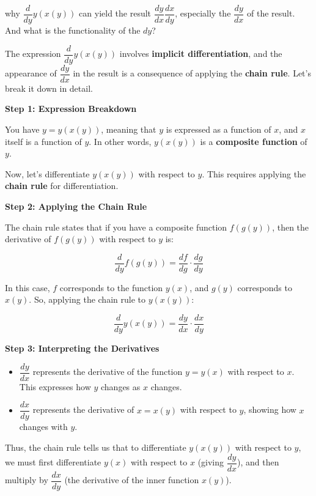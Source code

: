 \documentclass[a4paper,12pt]{book}
\begin{document}
\begin{bluebox}
why \(\dfrac{d}{dy} y(x(y))\) can yield the result \(\dfrac{dy}{dx} \dfrac{dx}{dy}\), especially the \(\dfrac{dy}{dx}\) of the result. And what is the functionality of the \(dy\)?
\end{bluebox}

The expression \( \dfrac{d}{dy} y(x(y)) \) involves \textbf{implicit differentiation}, and the appearance of \( \dfrac{dy}{dx} \) in the result is a consequence of applying the \textbf{chain rule}. Let's break it down in detail.

\textbf{Step 1: Expression Breakdown}

You have \( y = y(x(y)) \), meaning that \( y \) is expressed as a function of \( x \), and \( x \) itself is a function of \( y \). In other words, \( y(x(y)) \) is a \textbf{composite function} of \( y \).

Now, let’s differentiate \( y(x(y)) \) with respect to \( y \). This requires applying the \textbf{chain rule} for differentiation.

\textbf{Step 2: Applying the Chain Rule}

The chain rule states that if you have a composite function \( f(g(y)) \), then the derivative of \( f(g(y)) \) with respect to \( y \) is:

\[
\dfrac{d}{dy} f(g(y)) = \dfrac{df}{dg} \cdot \dfrac{dg}{dy}
\]

In this case, \( f \) corresponds to the function \( y(x) \), and \( g(y) \) corresponds to \( x(y) \). So, applying the chain rule to \( y(x(y)) \):

\[
\dfrac{d}{dy} y(x(y)) = \dfrac{dy}{dx} \cdot \dfrac{dx}{dy}
\]

\textbf{Step 3: Interpreting the Derivatives}

\begin{itemize}
	\item 
	\( \dfrac{dy}{dx} \) represents the derivative of the function \( y = y(x) \) with respect to \( x \). This expresses how \( y \) changes as \( x \) changes.
	\item 
	\( \dfrac{dx}{dy} \) represents the derivative of \( x = x(y) \) with respect to \( y \), showing how \( x \) changes with \( y \).
\end{itemize}

Thus, the chain rule tells us that to differentiate \( y(x(y)) \) with respect to \( y \), we must first differentiate \( y(x) \) with respect to \( x \) (giving \( \dfrac{dy}{dx} \)), and then multiply by \( \dfrac{dx}{dy} \) (the derivative of the inner function \( x(y) \)).
\end{document}
